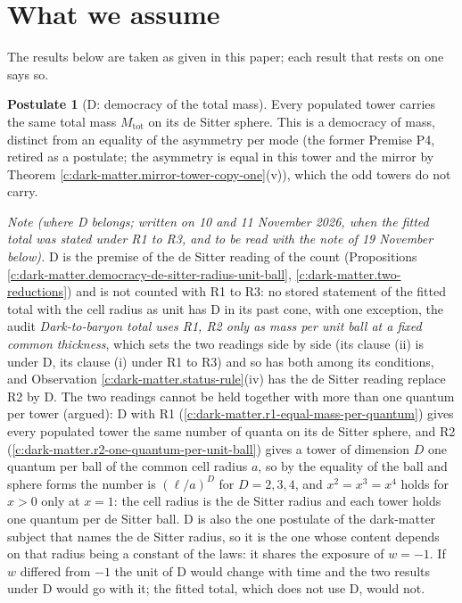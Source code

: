 \documentclass[11pt]{article}
\theoremstyle{definition}
\newtheorem{postulate}[theorem]{Postulate}
\theoremstyle{plain}
\newcommand{\changedmark}[2]{\marginpar{\raggedright\scriptsize\color{#1}#2}}
\begin{document}
\section*{What we assume}
The results below are taken as given in this paper; each result that rests on one says so.
\begin{postulate}[D: democracy of the total mass]\label{c:dark-matter.d-democracy-total-mass}
\changedmark{BurntOrange}{changed since the deposit}
Every populated tower carries the same total mass $M_{\mathrm{tot}}$ on its de Sitter sphere. This is a democracy of mass, distinct from an equality of the asymmetry per mode (the former Premise P4, retired as a postulate; the asymmetry is equal in this tower and the mirror by Theorem \ref{c:dark-matter.mirror-tower-copy-one}(v)), which the odd towers do not carry.

\emph{Note (where D belongs; written on 10 and 11 November 2026, when the fitted total was stated under R1 to R3, and to be read with the note of 19 November below).} D is the premise of the de Sitter reading of the count (Propositions \ref{c:dark-matter.democracy-de-sitter-radius-unit-ball}, \ref{c:dark-matter.two-reductions}) and is not counted with R1 to R3: no stored statement of the fitted total with the cell radius as unit has D in its past cone, with one exception, the audit \emph{Dark-to-baryon total uses R1, R2 only as mass per unit ball at a fixed common thickness}, which sets the two readings side by side (its clause (ii) is under D, its clause (i) under R1 to R3) and so has both among its conditions, and Observation \ref{c:dark-matter.status-rule}(iv) has the de Sitter reading replace R2 by D. The two readings cannot be held together with more than one quantum per tower (argued): D with R1 (\ref{c:dark-matter.r1-equal-mass-per-quantum}) gives every populated tower the same number of quanta on its de Sitter sphere, and R2 (\ref{c:dark-matter.r2-one-quantum-per-unit-ball}) gives a tower of dimension $D$ one quantum per ball of the common cell radius $a$, so by the equality of the ball and sphere forms the number is $(\ell/a)^{D}$ for $D = 2, 3, 4$, and $x^{2} = x^{3} = x^{4}$ holds for $x > 0$ only at $x = 1$: the cell radius is the de Sitter radius and each tower holds one quantum per de Sitter ball. D is also the one postulate of the dark-matter subject that names the de Sitter radius, so it is the one whose content depends on that radius being a constant of the laws: it shares the exposure of $w = -1$. If $w$ differed from $-1$ the unit of D would change with time and the two results under D would go with it; the fitted total, which does not use D, would not.


\end{postulate}
\end{document}
